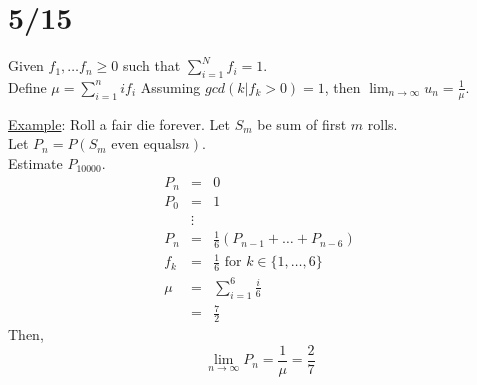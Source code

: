 \section*{5/15}
  \begin{theorem}
  Given $f_1, \ldots f_n \ge 0$ such that $\sum_{i = 1}^N f_i = 1$.\\
  Define $\mu = \sum_{i = 1}^ni f_i$
  Assuming $gcd(k | f_k > 0) = 1$, then $\lim_{n \to \infty} u_n = \frac{1}{\mu}$.\\
  \end{theorem}
  \underline{Example}: Roll a fair die forever. Let $S_m$ be sum of first $m$ rolls.\\
  Let $P_n = P(S_m \text{ even equals} n)$.\\
  Estimate $P_{10000}$.\\
  \begin{eqnarray*}
    P_n & = & 0 \\
    P_0 & = & 1 \\
    & \vdots & \\
    P_n & = & \frac{1}{6}(P_{n-1} + \ldots + P_{n-6})\\
    f_k & = & \frac{1}{6} \text{ for } k \in \{ 1, \ldots, 6\}\\
    \mu & = & \sum_{i = 1}^6 \frac{i}{6}\\
      & = & \frac{7}{2}
  \end{eqnarray*}
  Then, 
  $$
    \lim_{n \to \infty} P_n = \frac{1}{\mu} = \frac{2}{7}
  $$
